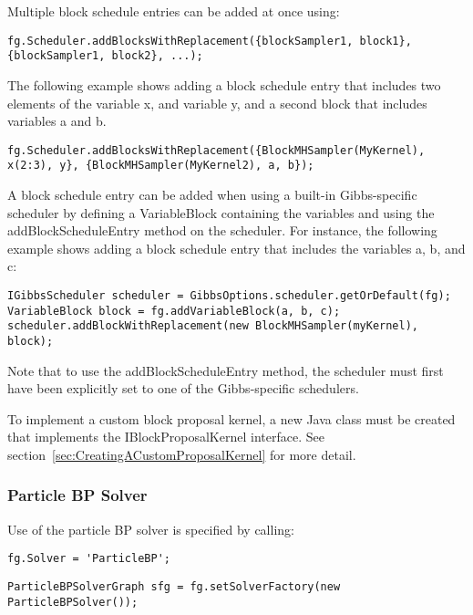Multiple block schedule entries can be added at once using:
\begin{lstlisting}
fg.Scheduler.addBlocksWithReplacement({blockSampler1, block1}, {blockSampler1, block2}, ...);
\end{lstlisting}

The following example shows adding a block schedule entry that includes two elements of the variable x, and variable y, and a second block that includes variables a and b.

\begin{lstlisting}
fg.Scheduler.addBlocksWithReplacement({BlockMHSampler(MyKernel), x(2:3), y}, {BlockMHSampler(MyKernel2), a, b});
\end{lstlisting}

\fi

\ifjava
A block schedule entry can be added when using a built-in Gibbs-specific scheduler by defining a VariableBlock containing the variables and using the addBlockScheduleEntry method on the scheduler. For instance, the following example shows adding a block schedule entry that includes the variables a, b, and c:

\begin{lstlisting}
IGibbsScheduler scheduler = GibbsOptions.scheduler.getOrDefault(fg);
VariableBlock block = fg.addVariableBlock(a, b, c);
scheduler.addBlockWithReplacement(new BlockMHSampler(myKernel), block);
\end{lstlisting}

Note that to use the addBlockScheduleEntry method, the scheduler must first have been explicitly set to one of the Gibbs-specific schedulers.
\fi

To implement a custom block proposal kernel, a new Java class must be created that implements the IBlockProposalKernel interface.  See section~\ref{sec:CreatingACustomProposalKernel} for more detail.

\clearpage
\subsubsection{Particle BP Solver}

Use of the particle BP solver is specified by calling:

\ifmatlab
\begin{lstlisting}
fg.Solver = 'ParticleBP';
\end{lstlisting}
\fi
\ifjava
\begin{lstlisting}
ParticleBPSolverGraph sfg = fg.setSolverFactory(new ParticleBPSolver());
\end{lstlisting}
\fi


